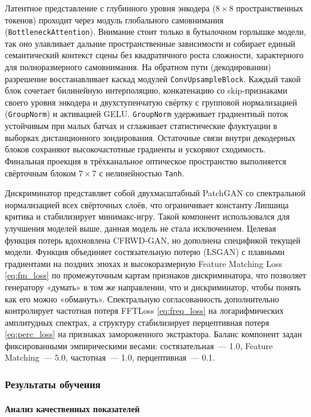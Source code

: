 Латентное представление с глубинного уровня энкодера ($8\times8$ пространственных токенов) проходит через модуль глобального самовнимания (\texttt{BottleneckAttention}).
Внимание стоит только в бутылочном горлышке модели, так оно улавливает дальние пространственные зависимости и собирает единый семантический контекст сцены без квадратичного роста сложности, характерного для полноразмерного самовнимания.
На обратном пути (декодировании) разрешение восстанавливает каскад модулей \texttt{ConvUpsampleBlock}.
Каждый такой блок сочетает билинейную интерполяцию, конкатенацию со skip-признаками своего уровня энкодера и двухступенчатую свёртку с групповой нормализацией (\texttt{GroupNorm}) и активацией GELU.
\texttt{GroupNorm} удерживает градиентный поток устойчивым при малых батчах и сглаживает статистические флуктуации в выборках дистанционного зондирования.
Остаточные связи внутри декодерных блоков сохраняют высокочастотные градиенты и ускоряют сходимость.
Финальная проекция в трёхканальное оптическое пространство выполняется свёрточным блоком $7\times7$ с нелинейностью \texttt{Tanh}.

Дискриминатор представляет собой двухмасштабный PatchGAN со спектральной нормализацией всех свёрточных слоёв, что ограничивает константу Липшица критика и стабилизирует минимакс-игру.
Такой компонент использовался для улучшения моделей выше, данная модель не стала исключением.
Целевая функция потерь вдохновлена CFRWD-GAN, но дополнена спецификой текущей модели.
Функция объединяет состязательную потерю (LSGAN) с плавными градиентами на поздних эпохах и высокоразмерную Feature Matching Loss \ref{eq:fm_loss} по промежуточным картам признаков дискриминатора, что позволяет генератору «думать» в том же направлении, что и дискриминатор, чтобы понять как его можно «обмануть».
Спектральную согласованность дополнительно контролирует частотная потеря FFTLoss \ref{eq:freq_loss} на логарифмических амплитудных спектрах, а структуру стабилизирует перцептивная потеря \ref{eq:perc_loss} на признаках замороженного экстрактора.
Баланс компонент задан фиксированными эмпирическими весами: состязательная~--- 1.0, Feature Matching~--- 5.0, частотная~--- 1.0, перцептивная~--- 0.1.

\subsubsection{Результаты обучения}
\paragraph{Анализ качественных показателей}

